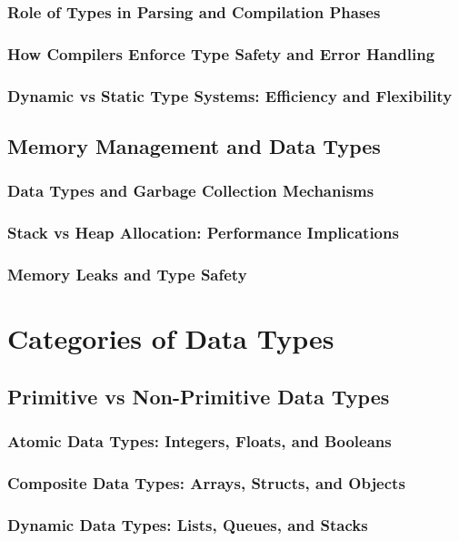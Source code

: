 \documentclass[12pt, oneside]{book}
\begin{document}
\subsubsection{Role of Types in Parsing and Compilation Phases}
\subsubsection{How Compilers Enforce Type Safety and Error Handling}
\subsubsection{Dynamic vs Static Type Systems: Efficiency and Flexibility}
\subsection{Memory Management and Data Types}
\subsubsection{Data Types and Garbage Collection Mechanisms}
\subsubsection{Stack vs Heap Allocation: Performance Implications}
\subsubsection{Memory Leaks and Type Safety}

\section{Categories of Data Types}
\subsection{Primitive vs Non-Primitive Data Types}
\subsubsection{Atomic Data Types: Integers, Floats, and Booleans}
\subsubsection{Composite Data Types: Arrays, Structs, and Objects}
\subsubsection{Dynamic Data Types: Lists, Queues, and Stacks}
\end{document}
